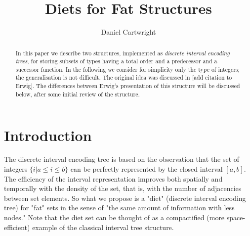\documentclass[a4paper]{article}
\title{Diets for Fat Structures}
\author{Daniel Cartwright}
\begin{document}
\maketitle

\begin{abstract}
In this paper we describe two structures, implemented as {\textit{discrete interval encoding trees}}, for storing subsets of types having a total order and a predecessor and a successor function. In the following we consider for simplicity only the type of integers; the generalisation is not difficult. The original idea was discussed in [add citation to Erwig]. The differences between Erwig's presentation of this structure will be discussed below, after some initial review of the structure.
\end{abstract} 

\section{Introduction}
The discrete interval encoding tree is based on the observation that the set of integers $\{ i | a \leq i \leq b \}$ can be perfectly represented by the closed interval $[a,b]$. The efficiency of the interval representation improves both spatially and temporally with the density of the set, that is, with the number of adjacencies between set elements. So what we propose is a "diet" (discrete interval encoding tree) for "fat" sets in the sense of "the same amount of information with less nodes." Note that the diet set can be thought of as a compactified (more space-efficient) example of the classical interval tree structure.
\end{document}
